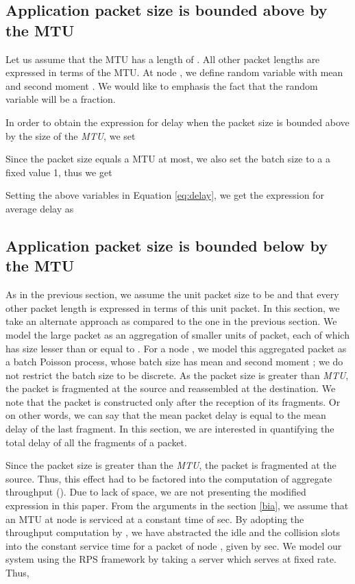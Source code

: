 \documentclass[10pt, conference, compsocconf]{IEEEtran}
\begin{document}
\subsection{Application packet size is bounded above by the MTU}
Let us assume that the MTU has a length of . All other packet lengths are expressed in terms of the MTU. At node , we define random variable  with mean  and second moment . We would like to emphasis the fact that the random variable  will be a fraction. 

In order to obtain the expression for delay when the packet size is bounded above by the size of the \textit{MTU}, we set 
 
Since the packet size equals a MTU at most, we also set the batch size to a a fixed value 1, thus we get
  
Setting the above variables in Equation \eqref{eq:delay}, we get the expression for average delay as


\subsection{Application packet size is bounded below by the MTU}
As in the previous section, we assume the unit packet size to be  and that every other packet length is expressed in terms of this unit packet. In this section, we take an alternate approach as compared to the one in the previous section. We model the large packet as an aggregation of smaller units of packet, each of which has size lesser than or equal to . For a node , we model this aggregated packet as a batch Poisson process, whose batch size has mean  and second moment ; we do not restrict the batch size to be discrete. As the packet size is greater than \textit{MTU}, the packet is fragmented at the source and reassembled at the destination. We note that the packet is constructed only after the reception of its fragments. Or on other words, we can say that the mean packet delay is equal to the mean delay of the last fragment. In this section, we are interested in quantifying the total delay of all the fragments of a packet. 

Since the packet size is greater than the \textit{MTU}, the packet is fragmented at the source.  Thus, this effect had to be factored into the computation of aggregate throughput (). Due to lack of space, we are not presenting the modified expression in this paper. From the arguments in the section \ref{bia}, we assume  that an MTU at node  is serviced at a constant time of  sec\footnotemark {}. By adopting the throughput computation by \cite{bianchi}, we have abstracted the idle and the collision slots into the constant service time for a packet of node , given by  sec. We model our system using the RPS framework by taking a server which serves at fixed rate. Thus,
\end{document}
